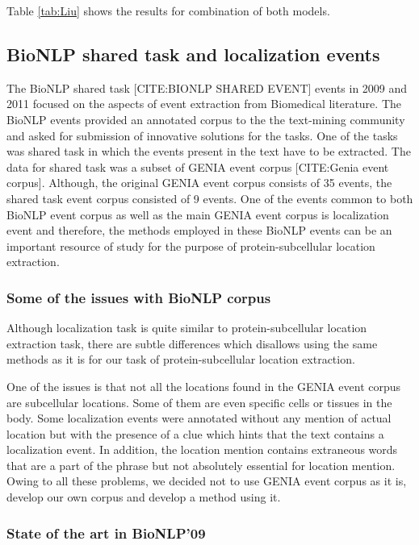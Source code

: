 Table \ref{tab:Liu} shows the results for combination of both models.

\subsection*{BioNLP shared task and localization events}
The BioNLP shared task [CITE:BIONLP SHARED EVENT] events in 2009 and 2011 focused on the aspects of event extraction from Biomedical literature. The BioNLP events provided an annotated corpus to the the text-mining community and asked for submission of innovative solutions for the tasks. One of the tasks was shared task in which the events present in the text have to be extracted. The data for shared task was a subset of GENIA event corpus [CITE:Genia event corpus]. Although, the original GENIA event corpus consists of 35 events, the shared task event corpus consisted of 9 events. One of the events common to both BioNLP event corpus as well as the main GENIA event corpus is localization event and therefore, the methods employed in these BioNLP events can be an important resource of study for the purpose of protein-subcellular location extraction.

\subsubsection*{Some of the issues with BioNLP corpus}

Although localization task is quite similar to protein-subcellular location extraction task, there are subtle differences which disallows using the same methods as it is for our task of protein-subcellular location extraction. 

One of the issues is that not all the locations found in the GENIA event corpus are subcellular locations. Some of them are even specific cells or tissues in the body. Some localization events were annotated without any mention of actual location but with the presence of a clue which hints that the text contains a localization event. In addition, the location mention contains extraneous words that are a part of the phrase but not absolutely essential for location mention. Owing to all these problems, we decided not to use GENIA event corpus as it is, develop our own corpus and develop a method using it.

\subsubsection*{State of the art in BioNLP'09}

